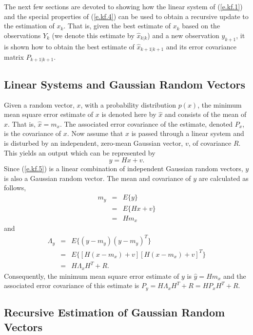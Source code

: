 	The next few sections are devoted to showing how
the linear system of (\ref{e.kf.1}) and the special properties
of (\ref{e.kf.4}) can be used to obtain a recursive update to the
estimation of $x_k$.  That is, given the best estimate of $x_k$
based on the observations $Y_k$ (we denote this estimate by 
$\hat{x}_{k|k}$) and a new observation $y_{k+1}$, it is shown
how to obtain the best estimate of $\hat{x}_{k+1|k+1}$ and its
error covariance matrix $P_{k+1|k+1}$.

\subsection{Linear Systems and Gaussian Random Vectors}

	Given a random vector, $x$, with a probability
distribution $p(x)$, the minimum mean square error estimate of
$x$ is denoted here by $\hat{x}$ and consists of the mean of
$x$.  That is, $\hat{x}=m_x$.
The associated error covariance of the estimate, denoted 
$P_x$, is the covariance of $x$.  Now assume that $x$ is passed 
through a linear system and is disturbed by an independent,
zero-mean Gaussian vector, $v$, of covariance $R$.  This yields an
output which can be represented by
%
\begin{equation}
y=Hx+v.
\label{e.kf.5}
\end{equation}
%
Since (\ref{e.kf.5}) is a linear combination of independent
Gaussian random vectors, $y$ is also a Gaussian random
vector.  The mean and covariance of $y$ are calculated
as follows,
%
\begin{eqnarray}
m_y&=&E\{y\}\nonumber\\
   &=&E\{Hx+v\}\nonumber\\
   &=&Hm_x    
\label{e.kf.6}
\end{eqnarray}
%
and
%
\begin{eqnarray}
\Lambda_y&=&E\{(y-m_y)(y-m_y)^T\}\nonumber\\
   &=&E\{[H(x-m_x)+v][H(x-m_x)+v]^T\}\nonumber\\
   &=&H\Lambda_xH^T+R.
\label{e.kf.7}
\end{eqnarray}
%
Consequently, the minimum mean square error estimate of $y$
is $\hat{y}=Hm_x$ and the associated error covariance of this
estimate is $P_y=H\Lambda_xH^T+R=HP_xH^T+R$.

\subsection{Recursive Estimation of Gaussian Random Vectors}

